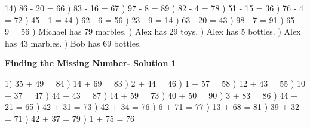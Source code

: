 \documentclass{article}%
\begin{document}
14) 86 {-} 20 = 66%
) 83 {-} 16 = 67%
) 97 {-} 8 = 89%
) 82 {-} 4 = 78%
) 51 {-} 15 = 36%
) 76 {-} 4 = 72%
) 45 {-} 1 = 44%
) 62 {-} 6 = 56%
) 23 {-} 9 = 14%
) 63 {-} 20 = 43%
) 98 {-} 7 = 91%
) 65 {-} 9 = 56%
) Michael has 79 marbles.%
) Alex has 29 toys.%
) Alex has 5 bottles.%
) Alex has 43 marbles.%
) Bob has 69 bottles.%
\newline%
\newpage%
\large%
\begin{center}%
\textbf{Finding the Missing Number- Solution 1}%
\newline%
\end{center} \normalsize%
1) 35 + 49 = 84%
) 14 + 69 = 83%
) 2 + 44 = 46%
) 1 + 57 = 58%
) 12 + 43 = 55%
) 10 + 37 = 47%
) 44 + 43 = 87%
) 14 + 59 = 73%
) 40 + 50 = 90%
) 3 + 83 = 86%
) 44 + 21 = 65%
) 42 + 31 = 73%
) 42 + 34 = 76%
) 6 + 71 = 77%
) 13 + 68 = 81%
) 39 + 32 = 71%
) 42 + 37 = 79%
) 1 + 75 = 76%
\end{document}
